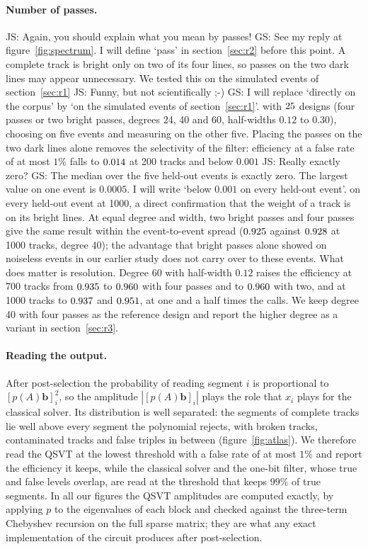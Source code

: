 \documentclass[11pt,a4paper]{article}
\newcommand{\js}[1]{{\color{blue} JS: #1 }}
\newcommand{\gs}[1]{{\color{orange!85!black} GS: #1 }}
\begin{document}
\paragraph{Number of passes.}
\js{Again, you should explain what you mean by passes!} \gs{See my reply at figure~\ref{fig:spectrum}. I will define `pass' in section~\ref{sec:r2} before this point.  }
A complete track is bright only on two of its four lines, so passes on the two dark lines may
appear unnecessary. We tested this on the simulated events of section~\ref{sec:r1} \js{Funny, but not scientifically ;-)} \gs{I will replace `directly on the corpus' by `on the simulated events of section~\ref{sec:r1}'.  } with $25$ designs (four passes or two
bright passes, degrees 24, 40 and 60, half-widths $0.12$ to $0.30$), choosing on five events and
measuring on the other five. Placing the passes on the two dark lines alone removes the selectivity of the filter:
efficiency at a false rate of at most $1\%$ falls to $0.014$ at 200 tracks and
below $0.001$ \js{Really exactly zero?} \gs{The median over the five held-out events is exactly zero. The largest value on one event is $0.0005$. I will write `below $0.001$ on every held-out event'.  } on every held-out event at 1000, a direct confirmation that the weight of a track is on its bright lines. At equal
degree and width, two bright passes and four passes give the same result within the event-to-event
spread ($0.925$ against $0.928$ at 1000 tracks, degree 40); the
advantage that bright passes alone showed on noiseless events in our earlier study does not carry
over to these events. What does matter is resolution. Degree 60 with half-width $0.12$ raises the efficiency at 700 tracks from
$0.935$ to $0.960$ with four passes and to $0.960$ with two, and at
1000 tracks to $0.937$ and $0.951$, at one and a half times the calls.
We keep degree 40 with four passes as the reference design and report the higher degree as a variant
in section~\ref{sec:r3}.

\paragraph{Reading the output.}
After post-selection the probability of reading segment $i$ is proportional to
$[p(A)\mathbf{b}]_i^2$, so the amplitude $|[p(A)\mathbf{b}]_i|$ plays the role that $x_i$ plays for
the classical solver. Its distribution is well separated: the segments of complete tracks lie well above every
segment the polynomial rejects, with broken tracks, contaminated tracks and false triples in
between (figure~\ref{fig:atlas}).
We therefore read the QSVT at the lowest threshold with a false rate of at most $1\%$ and report the
efficiency it keeps, while the classical solver and the one-bit filter, whose true and false levels overlap, are read at the threshold that keeps $99\%$ of true segments. In all our figures the QSVT
amplitudes are computed exactly, by applying $p$ to the eigenvalues of each block and checked
against the three-term Chebyshev recursion on the full sparse matrix; they are what any exact
implementation of the circuit produces after post-selection.
\end{document}
